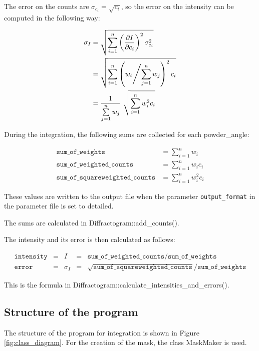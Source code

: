 \documentclass[a4paper, 12pt, twoside]{scrartcl}
\begin{document}
The error on the counts are $ \sigma_{c_i} = \sqrt{c_i} $, so the error on the intensity can be computed in the following way:

\begin{align*}
	\sigma_I &= \sqrt{\sum\limits_{i=1}^{n} \left(\frac{\partial I}{\partial c_i}\right)^2 \sigma_{c_i}^2} \\
	&= \sqrt{\sum\limits_{i=1}^{n} \left(w_i \middle/ \sum\limits_{j=1}^{n} w_j\right)^2 c_i} \\
	&= \frac{1}{\sum\limits_{j=1}^{n} w_j}~ \sqrt{\sum\limits_{i=1}^{n} w_i^2 c_i}
\end{align*}

During the integration, the following sums are collected for each powder\_angle:

\begin{align*}
	\texttt{sum\_of\_weights} &= \sum\limits_{i=1}^{n} w_i \\
	\texttt{sum\_of\_weighted\_counts} &= \sum\limits_{i=1}^{n} w_i c_i \\
	\texttt{sum\_of\_squareweighted\_counts} &= \sum\limits_{i=1}^{n} w_i^2 c_i
\end{align*}

These values are written to the output file when the parameter \texttt{output\_format} in the parameter file is set to detailed.

The sums are calculated in Diffractogram::add\_counts().

The intensity and its error is then calculated as follows:

\begin{align*}
	\texttt{intensity} &=& I &=& \texttt{sum\_of\_weighted\_counts}\big/\texttt{sum\_of\_weights} \\
	\texttt{error} &=& \sigma_I &=& \sqrt{\texttt{sum\_of\_squareweighted\_counts}}\big/\texttt{sum\_of\_weights}
\end{align*}

This is the formula in Diffractogram::calculate\_intensities\_and\_errors().

\subsection{Structure of the program}

The structure of the program for integration is shown in Figure \ref{fig:class_diagram}. For the creation of the mask, the class MaskMaker is used.
\end{document}

